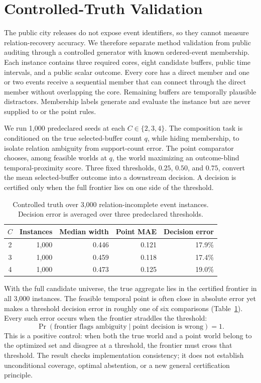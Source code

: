 \section{Controlled-Truth Validation}
\label{sec:truth}

The public city releases do not expose event identifiers, so they cannot measure
relation-recovery accuracy. We therefore separate method validation from public
auditing through a controlled generator with known ordered-event membership.
Each instance contains three required cores, eight candidate buffers, public
time intervals, and a public scalar outcome. Every core has a direct member and
one or two events receive a sequential member that can connect through the
direct member without overlapping the core. Remaining buffers are temporally
plausible distractors. Membership labels generate and evaluate the instance but
are never supplied to \methodname{} or the point rules.

We run 1,000 predeclared seeds at each $C\in\{2,3,4\}$. The composition task is
conditioned on the true selected-buffer count $q$, while hiding membership, to
isolate relation ambiguity from support-count error. The point comparator
chooses, among feasible worlds at $q$, the world maximizing an outcome-blind
temporal-proximity score. Three fixed thresholds, $0.25$, $0.50$, and $0.75$,
convert the mean selected-buffer outcome into a downstream decision. A decision
is certified only when the full frontier lies on one side of the threshold.

\begin{table}[t]
\caption{Controlled truth over 3,000 relation-incomplete event instances.
Decision error is averaged over three predeclared thresholds.}
\label{tab:truth}
\small
\centering
\begin{tabular}{@{}crrrr@{}}
\toprule
$C$ & Instances & Median width & Point MAE & Decision error \\
\midrule
2 & 1,000 & 0.446 & 0.121 & 17.9\% \\
3 & 1,000 & 0.459 & 0.118 & 17.4\% \\
4 & 1,000 & 0.473 & 0.125 & 19.0\% \\
\bottomrule
\end{tabular}
\end{table}

With the full candidate universe, the true aggregate lies in the certified
frontier in all 3,000 instances. The feasible temporal point is often close in
absolute error yet makes a threshold decision error in roughly one of six
comparisons (Table~\ref{tab:truth}). Every such error occurs when the frontier
straddles the threshold:
\[
\Pr(\text{frontier flags ambiguity}\mid \text{point decision is wrong})=1.
\]
This is a positive control: when both the true world and a point world belong
to the optimized set and disagree at a threshold, the frontier must cross that
threshold. The result checks implementation consistency; it does not establish
unconditional coverage, optimal abstention, or a new general certification
principle.

